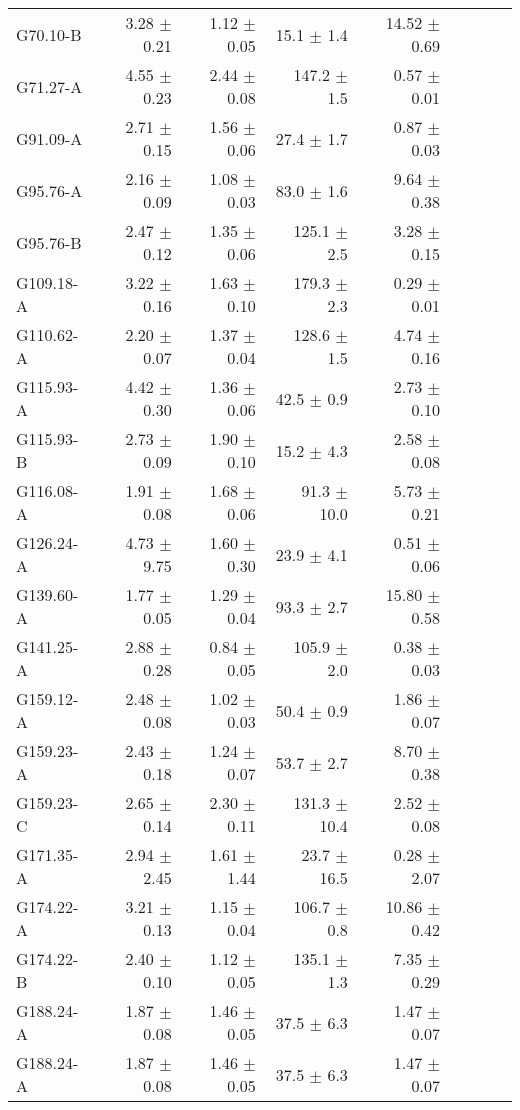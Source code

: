 \documentclass[printer]{aa}
\begin{document}
\begin{table}[t]
{\begin{tabular}{l r r r r r r r r}
G70.10-B & 3.28 $\pm$ 0.21 & 1.12 $\pm$ 0.05 &  15.1 $\pm$   1.4 & 14.52 $\pm$  0.69 \\
G71.27-A & 4.55 $\pm$ 0.23 & 2.44 $\pm$ 0.08 & 147.2 $\pm$   1.5 &  0.57 $\pm$  0.01 \\
G91.09-A & 2.71 $\pm$ 0.15 & 1.56 $\pm$ 0.06 &  27.4 $\pm$   1.7 &  0.87 $\pm$  0.03 \\
G95.76-A & 2.16 $\pm$ 0.09 & 1.08 $\pm$ 0.03 &  83.0 $\pm$   1.6 &  9.64 $\pm$  0.38 \\
G95.76-B & 2.47 $\pm$ 0.12 & 1.35 $\pm$ 0.06 & 125.1 $\pm$   2.5 &  3.28 $\pm$  0.15 \\
G109.18-A & 3.22 $\pm$ 0.16 & 1.63 $\pm$ 0.10 & 179.3 $\pm$   2.3 &  0.29 $\pm$  0.01 \\
G110.62-A & 2.20 $\pm$ 0.07 & 1.37 $\pm$ 0.04 & 128.6 $\pm$   1.5 &  4.74 $\pm$  0.16 \\
G115.93-A & 4.42 $\pm$ 0.30 & 1.36 $\pm$ 0.06 &  42.5 $\pm$   0.9 &  2.73 $\pm$  0.10 \\
G115.93-B & 2.73 $\pm$ 0.09 & 1.90 $\pm$ 0.10 &  15.2 $\pm$   4.3 &  2.58 $\pm$  0.08 \\
G116.08-A & 1.91 $\pm$ 0.08 & 1.68 $\pm$ 0.06 &  91.3 $\pm$  10.0 &  5.73 $\pm$  0.21 \\
G126.24-A & 4.73 $\pm$ 9.75 & 1.60 $\pm$ 0.30 &  23.9 $\pm$   4.1 &  0.51 $\pm$  0.06 \\
G139.60-A & 1.77 $\pm$ 0.05 & 1.29 $\pm$ 0.04 &  93.3 $\pm$   2.7 & 15.80 $\pm$  0.58 \\
G141.25-A & 2.88 $\pm$ 0.28 & 0.84 $\pm$ 0.05 & 105.9 $\pm$   2.0 &  0.38 $\pm$  0.03 \\
G159.12-A & 2.48 $\pm$ 0.08 & 1.02 $\pm$ 0.03 &  50.4 $\pm$   0.9 &  1.86 $\pm$  0.07 \\
G159.23-A & 2.43 $\pm$ 0.18 & 1.24 $\pm$ 0.07 &  53.7 $\pm$   2.7 &  8.70 $\pm$  0.38 \\
G159.23-C & 2.65 $\pm$ 0.14 & 2.30 $\pm$ 0.11 & 131.3 $\pm$  10.4 &  2.52 $\pm$  0.08 \\
G171.35-A & 2.94 $\pm$ 2.45 & 1.61 $\pm$ 1.44 &  23.7 $\pm$  16.5 &  0.28 $\pm$  2.07 \\
G174.22-A & 3.21 $\pm$ 0.13 & 1.15 $\pm$ 0.04 & 106.7 $\pm$   0.8 & 10.86 $\pm$  0.42 \\
G174.22-B & 2.40 $\pm$ 0.10 & 1.12 $\pm$ 0.05 & 135.1 $\pm$   1.3 &  7.35 $\pm$  0.29 \\
G188.24-A & 1.87 $\pm$ 0.08 & 1.46 $\pm$ 0.05 &  37.5 $\pm$   6.3 &  1.47 $\pm$  0.07 \\
G188.24-A & 1.87 $\pm$ 0.08 & 1.46 $\pm$ 0.05 &  37.5 $\pm$   6.3 &  1.47 $\pm$  0.07 \\

\end{tabular}}
\end{table}
\end{document}
